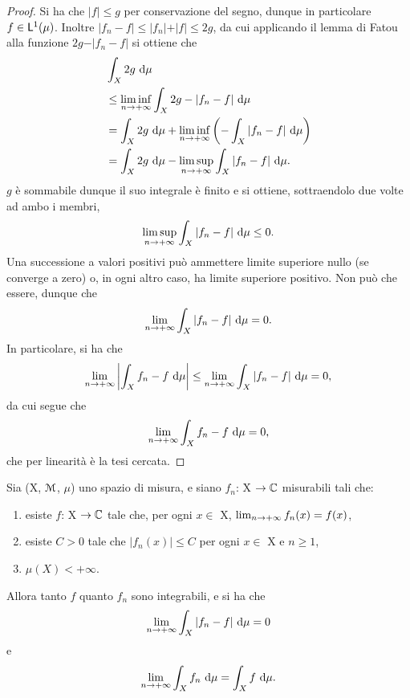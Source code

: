 \documentclass[Completo.tex]{subfiles}
\begin{document}
\begin{proof}
	Si ha che $\vert f \vert \leq g$ per conservazione del segno, dunque in particolare $f \in \sf[L]^1(\mu)$. Inoltre $\vert f_n - f \vert \leq \vert f_n \vert + \vert f \vert \leq 2g$, da cui applicando il lemma di Fatou alla funzione $2g - \vert f_n - f \vert$ si ottiene che
	\begin{align*}
	&\int_X 2g \ \mathrm{d}\mu \\
	&\leq \liminf_{n \ra +\infty} \int_X 2g-\vert f_n - f \vert \ \mathrm{d}\mu \\
	&= \int_X 2g \ \mathrm{d}\mu + \liminf_{n \ra +\infty} \left(-\int_X \vert f_n - f \vert \ \mathrm{d}\mu\right) \\
	&= \int_X 2g \ \mathrm{d}\mu - \limsup_{n \ra +\infty} \int_X \vert f_n - f \vert \ \mathrm{d}\mu.
	\end{align*}
	$g$ è sommabile dunque il suo integrale è finito e si ottiene, sottraendolo due volte ad ambo i membri,
	\begin{equation*}
	\limsup_{n \rightarrow +\infty} \int_X \vert f_n - f \vert \ \mathrm{d}\mu \leq 0.
	\end{equation*}
	Una successione a valori positivi può ammettere limite superiore nullo (se converge a zero) o, in ogni altro caso, ha limite superiore positivo. Non può che essere, dunque che
	\begin{equation*}
	\lim_{n \rightarrow +\infty} \int_X \vert f_n - f \vert \ \mathrm{d}\mu = 0.
	\end{equation*}
	In particolare, si ha che
	\begin{equation*}
	\lim_{n \rightarrow +\infty} \left\vert \int_X f_n - f \ \mathrm{d}\mu \right\vert \leq \lim_{n \rightarrow +\infty} \int_X \vert f_n - f \vert \ \mathrm{d}\mu = 0,
	\end{equation*}
	da cui segue che
	\begin{equation*}
	\lim_{n \rightarrow +\infty} \int_X f_n - f \ \mathrm{d}\mu = 0,
	\end{equation*}
	che per linearità è la tesi cercata.
\end{proof}
\begin{Cor}
	Sia (X, $\eu[M]$, $\mu$) uno spazio di misura, e siano $f_n$: X $\ra \bb[C]$ misurabili tali che:
	\begin{enumerate}
		\item esiste $f$: X $\ra \bb[C]$ tale che, per ogni $x \in$ X, $\lim_{n \rightarrow +\infty} f_n(x) = f(x)$,
		\item esiste $C > 0$ tale che $\vert f_n(x) \vert \leq C$ per ogni $x \in$ X e $n\geq1$,
		\item $\mu(X) < +\infty$.
	\end{enumerate}
	Allora tanto $f$ quanto $f_n$ sono integrabili, e si ha che
	\begin{equation*}
	\lim_{n \rightarrow +\infty} \int_X \vert f_n - f \vert \ \mathrm{d}\mu = 0
	\end{equation*}
	e
	\begin{equation*}
	\lim_{n \rightarrow +\infty} \int_X f_n \ \mathrm{d}\mu = \int_X f \ \mathrm{d}\mu.
	\end{equation*}
\end{Cor}
\end{document}
